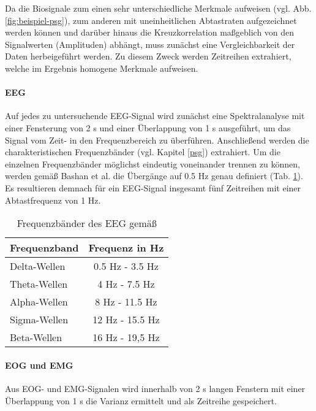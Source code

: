 Da die Biosignale zum einen sehr unterschiedliche Merkmale aufweisen (vgl. Abb. \ref{fig:beispiel-psg}), zum anderen mit uneinheitlichen Abtastraten aufgezeichnet werden können und darüber hinaus die Kreuzkorrelation maßgeblich von den Signalwerten (Amplituden) abhängt, muss zunächst eine Vergleichbarkeit der Daten herbeigeführt werden. Zu diesem Zweck werden Zeitreihen extrahiert, welche im Ergebnis homogene Merkmale aufweisen.

\paragraph{\acs{EEG}}
Auf jedes zu untersuchende \acs{EEG}-Signal wird zunächst eine Spektralanalyse mit einer Fensterung von 2 s und einer Überlappung von 1 s ausgeführt, um das Signal vom Zeit- in den Frequenzbereich zu überführen. Anschließend werden die charakteristischen Frequenzbänder (vgl. Kapitel \ref{psg}) extrahiert. Um die einzelnen Frequenzbänder möglichst eindeutig voneinander trennen zu können, werden gemäß Bashan et al. die Übergänge auf 0.5 Hz genau definiert (Tab. \ref{tab:frequenzen}). Es resultieren demnach für ein \acs{EEG}-Signal insgesamt fünf Zeitreihen mit einer Abtastfrequenz von 1 Hz. \parencite{bashan_network_2012}\\


\begin{table}[H] 
\centering
\begin{small}
\begin{tabular}{lc}
\toprule
\multicolumn{1}{l}{\textbf{Frequenzband}} & \multicolumn{1}{c}{\textbf{Frequenz in Hz}}\\  
\midrule
Delta-Wellen & 0.5 Hz - 3.5 Hz\\
Theta-Wellen & 4 Hz - 7.5 Hz\\
Alpha-Wellen & 8 Hz - 11.5 Hz\\
Sigma-Wellen & 12 Hz - 15.5 Hz\\
Beta-Wellen & 16 Hz - 19,5 Hz\\
\bottomrule
\end{tabular}
\caption[Frequenzbänder des \acs{EEG}]{Frequenzbänder des \acs{EEG} gemäß \parencite{bashan_network_2012}}
\label{tab:frequenzen}
\end{small}
\end{table}


\paragraph{\acs{EOG} und \acs{EMG}}
Aus \acs{EOG}- und \acs{EMG}-Signalen wird innerhalb von 2 s langen Fenstern mit einer Überlappung von 1 s die Varianz ermittelt und als Zeitreihe gespeichert.\parencite{bashan_network_2012}\\

